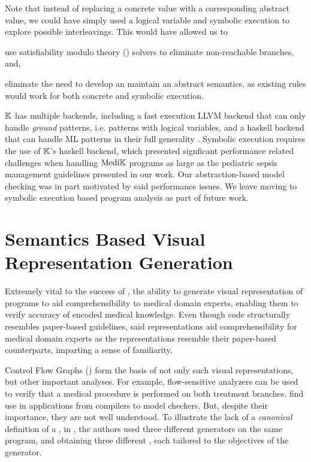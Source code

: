 Note that instead of replacing a concrete value with a corresponding abstract value,
we could have simply used a logical variable and symbolic execution to explore
possible interleavings. This would have allowed us to
\begin{enumerate*}
  \item use satisfiability modulo theory (\SMT{}) solvers to eliminate
  non-reachable branches, and,
  \item eliminate the need to develop an maintain an abstract semantics, as
  existing rules would work for both concrete and symbolic execution.
\end{enumerate*}

$\mathbb{K}$ has multiple backends, including a fast execution LLVM backend
that can only handle \emph{ground} patterns, i.e. patterns with logical
variables, and a haskell backend that can handle ML patterns in their
full generality \cite{KFrameworkBackendsUrl}. Symbolic execution requires the use of $\mathbb{K}$'s haskell
backend, which presented signficant performance related challenges when
handling $\text{Medi}\mathbb{K}{}{}$ programs as large as the pediatric sepsis management
guidelines presented in our work. Our abstraction-based model checking was in part motivated by
said performance issues. We leave moving to symbolic execution based
program analysis as part of future work.

\section{Semantics Based Visual Representation Generation}\label{subsec:visual-representation-generation}

Extremely vital to the success of \MediK{}, the ability
to generate visual representation of \MediK{} programs to aid
comprehensibility to medical domain experts, enabling them to verify
accuracy of encoded medical knowledge. Even though \MediK{} code
structurally resembles paper-based guidelines, said
representations aid comprehensibility for medical
domain experts as the representations resemble their paper-based counterparts,
imparting a sense of familiarity.

Control Flow Graphs (\CFGs{}) form the basis of not only such visual
representations, but other important analyses. For example,
flow-sensitive analyzers can be used to verify that a medical procedure
is performed on both treatment branches.
\CFGs{} find use in applications from compilers to model checkers.
But, despite their importance, they are not well understood.
To illustrate the lack of a \emph{canonical} definition of a \CFG{},
in \cite{KoppelICFP22}, the authors
used three different \CFG{} generators
on the same program, and obtaining three different \CFGs{}, each
tailored to the objectives of the generator.

